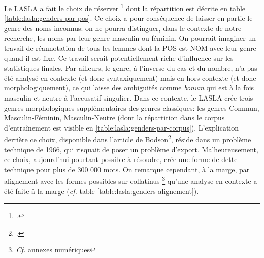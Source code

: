 \newpara

Le LASLA a fait le choix de réserver \footcite[p.~27]{BodsonCodification1966} dont la répartition est décrite en table \ref{table:lasla:genders-par-pos}. Ce choix a pour conséquence de laisser en partie le genre des noms inconnus: on ne pourra distinguer, dans le contexte de notre recherche, les noms par leur genre masculin ou féminin. On pourrait imaginer un travail de réannotation de tous les lemmes dont la POS est NOM avec leur genre quand il est fixe. Ce travail serait potentiellement riche d'influence sur les statistiques finales. Par ailleurs, le genre, à l'inverse du cas et du nombre, n'a pas été analysé en contexte (et donc syntaxiquement) mais en hors contexte (et donc morphologiquement), ce qui laisse des ambiguités comme \textit{bonum} qui est à la fois masculin et neutre à l'accusatif singulier. Dans ce contexte, le LASLA crée trois genres morphologiques supplémentaires des genres classiques: les genres Commun, Masculin-Féminin, Masculin-Neutre (dont la répartition dans le corpus d'entraînement est visible en \ref{table:lasla:genders-par-corpus}). L'explication derrière ce choix, disponible dans l'article de Bodson\footcite{BodsonCodification1966}, réside dans un problème technique de 1966, qui risquait de poser un problème d'export. Malheureusement, ce choix, aujourd'hui pourtant possible à résoudre, crée une forme de dette technique pour plus de 300 000 mots. On remarque cependant, à la marge, par alignement avec les formes possibles sur collatinus \footnote{\textit{Cf.} annexes numériques} qu'une analyse en contexte a été faite à la marge (\textit{cf.} table \ref{table:lasla:genders-alignement}).

